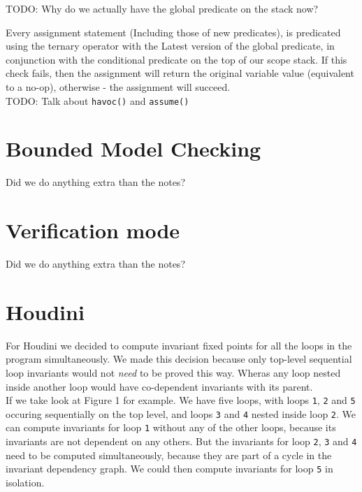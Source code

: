 \documentclass[11pt]{article}
\begin{document}
TODO: Why do we actually have the global predicate on the stack now?

Every assignment statement (Including those of new predicates), is predicated using the ternary operator
with the Latest version of the global predicate, in conjunction with the conditional predicate on the
top of our scope stack. If this check fails, then the assignment will return the original variable value
(equivalent to a no-op), otherwise - the assignment will succeed. \\

TODO: Talk about \verb|havoc()| and \verb|assume()|

\section{Bounded Model Checking}
Did we do anything extra than the notes?
\section{Verification mode}
Did we do anything extra than the notes?
\section{Houdini}

For Houdini we decided to compute invariant fixed points for all the loops in the program simultaneously.
We made this decision because only top-level sequential loop invariants would not \emph{need} to be proved
this way. Wheras any loop nested inside another loop would have co-dependent invariants with its parent. \\

If we take look at Figure 1 for example. We have five loops, with loops \verb|1|, \verb|2| and \verb|5| occuring
sequentially on the top level, and loops \verb|3| and \verb|4| nested inside loop \verb|2|. We can compute
invariants for loop \verb|1| without any of the other loops, because its invariants are not dependent on any
others. But the invariants for loop \verb|2|, \verb|3| and \verb|4| need to be computed simultaneously, because
they are part of a cycle in the invariant dependency graph. We could then compute invariants for loop \verb|5|
in isolation. \\
\end{document}
